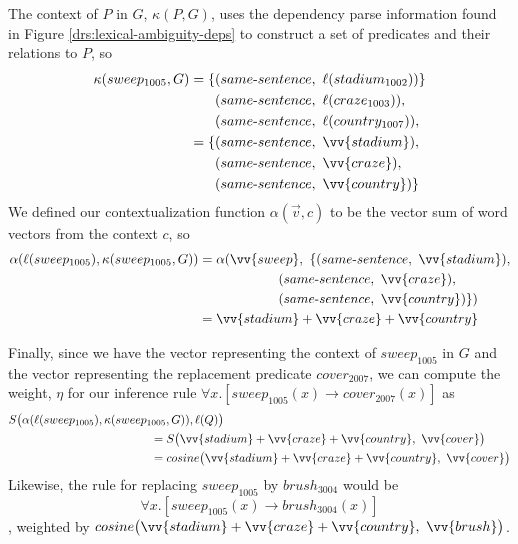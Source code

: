 The context of $P$ in $G$, $\kappa(P,G)$, uses the dependency parse information
found in Figure \ref{drs:lexical-ambiguity-deps} to construct a set of
predicates and their relations to $P$, so
\begin{align*}
\kappa(sweep_{1005}, G) 
= \{ & (same\text{-}sentence,~\ell(\pred{stadium}{1002})) \} \\
     & (same\text{-}sentence,~\ell(\pred{craze}{1003})), \\ 
     & (same\text{-}sentence,~\ell(\pred{country}{1007})), \\ 
= \{ & (same\text{-}sentence,~\vv{stadium}), \\
     & (same\text{-}sentence,~\vv{craze}), \\
     & (same\text{-}sentence,~\vv{country}) \}
\end{align*}
We defined our contextualization function $\alpha(\vec v, c)$ to be the vector
sum of word vectors from the context $c$, so
\begin{align*}
\alpha(\ell(sweep_{1005}), \kappa(sweep_{1005}, G))
& = \alpha(\vv{sweep},~ \{ 
                (same\text{-}sentence,~\vv{stadium}), \\
& \hspace{60px} (same\text{-}sentence,~\vv{craze}), \\
& \hspace{60px} (same\text{-}sentence,~\vv{country}) \}) \\
& = \vv{stadium} + \vv{craze} + \vv{country}
\end{align*}

Finally, since we have the vector representing the context of $sweep_{1005}$ in
$G$ and the vector representing the replacement predicate $cover_{2007}$, we can
compute the weight, $\eta$ for our inference rule $\forall x.[sweep_{1005}(x)
\to cover_{2007}(x)]$ as
\begin{align*}
& S\big(\alpha(\ell(sweep_{1005}), \kappa(sweep_{1005}, G)), \ell(Q)\big) \\
& \hspace{120px} = S\big(\vv{stadium} + \vv{craze} + \vv{country},~ \vv{cover}\big) \\
& \hspace{120px} = cosine\big(\vv{stadium} + \vv{craze} + \vv{country},~ \vv{cover}\big)
\end{align*}
Likewise, the rule for replacing $sweep_{1005}$ by $brush_{3004}$ would be 
\[ \forall x.[sweep_{1005}(x) \to brush_{3004}(x)] \], weighted by 
$cosine\big(\vv{stadium} + \vv{craze} + \vv{country},~ \vv{brush}\big)$.

